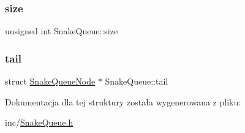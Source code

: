 \subsubsection{\texorpdfstring{size}{size}}
{\footnotesize\ttfamily unsigned int Snake\+Queue\+::size}

\mbox{\label{struct_snake_queue_a64b466f24a60ecdc42f28d98b3bb890b}} 
\subsubsection{\texorpdfstring{tail}{tail}}
{\footnotesize\ttfamily struct \mbox{\hyperlink{struct_snake_queue_node}{Snake\+Queue\+Node}} $\ast$ Snake\+Queue\+::tail}



Dokumentacja dla tej struktury została wygenerowana z pliku\+:\begin{DoxyCompactItemize}
\item 
inc/\mbox{\hyperlink{_snake_queue_8h}{Snake\+Queue.\+h}}\end{DoxyCompactItemize}
